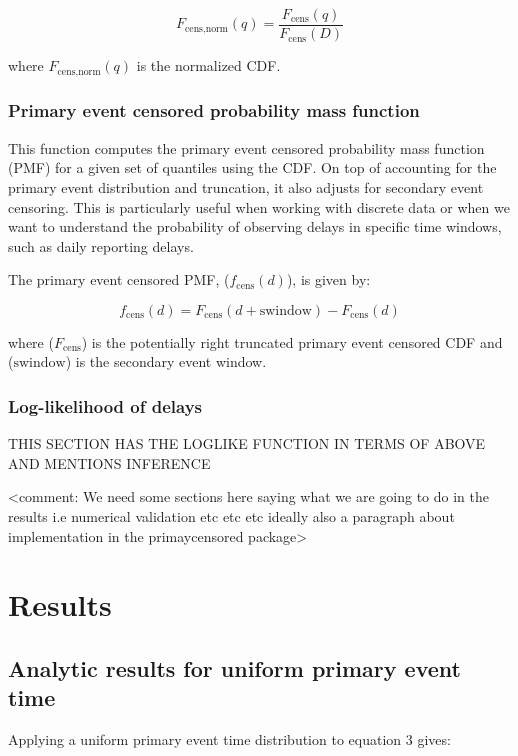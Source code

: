 \documentclass[10pt,letterpaper]{article}
\begin{document}
\begin{equation}
F_{\text{cens,norm}}(q) = \frac{F_{\text{cens}}(q)}{F_{\text{cens}}(D)}
\end{equation}

where $F_{\text{cens,norm}}(q)$ is the normalized CDF.

\subsubsection{Primary event censored probability mass function}
This function computes the primary event censored probability mass function (PMF) for a given set of quantiles using the CDF. On top of accounting for the primary event distribution and truncation, it also adjusts for secondary event censoring. This is particularly useful when working with discrete data or when we want to understand the probability of observing delays in specific time windows, such as daily reporting delays.

The primary event censored PMF, ($f_{\text{cens}}(d)$), is given by:

\begin{equation}
f_{\text{cens}}(d) = F_{\text{cens}}(d + \text{swindow}) - F_{\text{cens}}(d)
\end{equation}

where ($F_{\text{cens}}$) is the potentially right truncated primary event censored CDF and ($\text{swindow}$) is the secondary event window.

\subsubsection{Log-likelihood of delays}
THIS SECTION HAS THE LOGLIKE FUNCTION IN TERMS OF ABOVE AND MENTIONS INFERENCE

<comment: We need some sections here saying what we are going to do in the results i.e numerical validation etc etc etc ideally also a paragraph about implementation in the primaycensored package>

\section*{Results}

\subsection{Analytic results for uniform primary event time}

Applying a uniform primary event time distribution to equation 3
gives:
\end{document}
